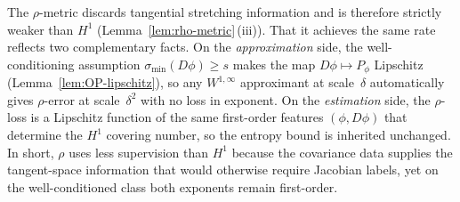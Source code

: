\documentclass[11pt]{article}
\newcommand{\sigmin}{\sigma_{\min}}
\begin{document}
The $\rho$-metric discards tangential stretching
information and is therefore strictly weaker than $H^1$
(Lemma~\ref{lem:rho-metric}\,(iii)).
That it achieves the same rate reflects two complementary
facts.
On the \emph{approximation} side, the
well-conditioning assumption $\sigmin(D\phi)\ge s$
makes the map $D\phi\mapsto P_\phi$ Lipschitz
(Lemma~\ref{lem:OP-lipschitz}), so any $W^{1,\infty}$
approximant at scale~$\delta$ automatically gives
$\rho$-error at scale~$\delta^2$ with no loss in
exponent.
On the \emph{estimation} side, the $\rho$-loss is a
Lipschitz function of the same first-order features
$(\phi,D\phi)$ that determine the $H^1$ covering number,
so the entropy bound is inherited unchanged.
In short, $\rho$ uses less supervision than
$H^1$ because the covariance data supplies the
tangent-space information that would otherwise require
Jacobian labels, yet on the well-conditioned class both
exponents remain first-order.
\end{document}
